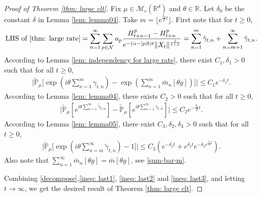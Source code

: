 \documentclass[12pt,a4paper]{amsart}
\theoremstyle{plain}
\theoremstyle{definition}
\numberwithin{equation}{section}
\begin{document}
\begin{proof}[Proof of Theorem \ref{thm: large clt}]
    Fix $\mu \in \mathcal M_c(\mathbb R^d)$ and $\theta \in \mathbb R$.
    Let $\delta_0$ be the constant $\delta$ in Lemma \ref{lem: lemma04}.  
    Take $m=\lfloor e^{\frac{\delta_0}{2}t}\rfloor$.
    First note that for $t\ge 0$,
\begin{align}\label{decompose}
    \text{LHS of \eqref{thm: large rate}}
    =\sum_{n=1}^{\infty}\sum_{p\in \mathcal{N}}a_p\frac{H^p_{t+n-1}-H^p_{t+n}}{e^{-(\alpha-|p|b)t}\|X_t\|^{\frac{1}{1+\beta}}}=\sum_{n=1}^m\tilde{\gamma}_{t,n}+\sum_{n=m+1}^{\infty}\tilde{\gamma}_{t,n}.
\end{align}
    According to Lemma \ref{lem: independency for large rate}, there exist $C_1,\delta_1>0$ such that for all $t\geq 0$,
\begin{align}\label{ineq: last1}
    \Big|\tilde{\mathbb{P}}_{\mu}\Big[\exp(i\theta\sum_{n=1}^m\gamma_{t,n})-\exp(\sum_{n=1}^m\bar{m}_n[\theta g])\Big]
    \Big|\leq C_1 e^{-\delta_1 t}.
\end{align}
    According to Lemma \ref{lem: lemma04}, there exists $C_2>0$ such that for all $t\geq 0$,
\begin{align}\label{ineq: last2}
    \Big|\tilde{\mathbb{P}}_{\mu}[e^{i\theta\sum_{n=1}^m \tilde{\gamma}_{t,n}}]-\tilde{\mathbb{P}}_{\mu}[e^{i\theta \sum_{n=1}^m\gamma_{t,n}}]\Big|\leq C_2  e^{-\frac{\delta_0}{2} t}.
 \end{align}
    According to Lemma \ref{lem: lemma05}, there exist $C_3,\delta_2,\delta_3>0$ such that for all $t\geq 0$,
\begin{align}\label{ineq: last3}
    \Big|\tilde{\mathbb{P}}_{\mu}\Big[\exp(i\theta \sum_{n=m}^{\infty}\tilde{\gamma}_{t,n})-1\Big]\Big|\leq C_3(e^{-\delta_2 t}+e^{\delta_2 t}e^{-\delta_3 e^{\frac{\delta_0}{2}t}}).
\end{align}
    Also note that $\sum_{n=1}^\infty\bar{m}_n[\theta g]=\bar{m}[\theta g]$, see \eqref{sum-bar-m}.

    Combining \eqref{decompose},\eqref{ineq: last1}, \eqref{ineq: last2} and \eqref{ineq: last3}, and letting $t\to\infty$, we get the desired result of Theorem \ref{thm: large clt}.
\end{proof}
  
\end{document}
